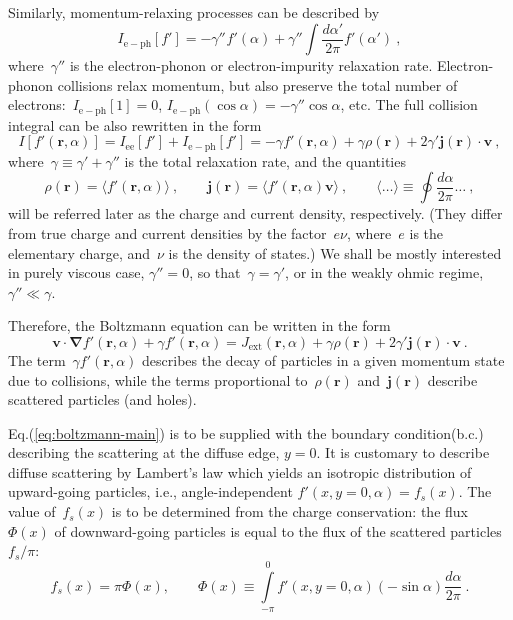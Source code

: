 \documentclass[preprint,aps,eqsecnum, prb]{revtex4-1}
\begin{document}
Similarly, momentum-relaxing processes can be described by
\begin{equation}
I_\mathrm{e-ph}[f'] = - \gamma'' _\mathrm{} f'(\alpha)
  + \gamma'' \int \frac{d\alpha'}{2\pi} f'(\alpha')
\ ,
\end{equation}
where~$\gamma''$ is the electron-phonon or electron-impurity relaxation rate.
Electron-phonon collisions relax momentum, but also preserve
the total number of electrons:~$I_\mathrm{e-ph}[1] = 0$,
$I_\mathrm{e-ph}(\cos\alpha) = - \gamma'' \cos\alpha$, etc.
The full collision integral can be also rewritten
in the form
\begin{equation}
  \label{eq:collision-integral}
  I[f'({\bm r}, \alpha)] = I_\mathrm{ee}[f'] + I_\mathrm{e-ph}[f'] =  -\gamma f'({\bm r}, \alpha)
  + \gamma \rho({\bm r}) + 2 \gamma' {\bm j}({\bm r}) \cdot {\bm v}
 \ ,
\end{equation}
where~$\gamma \equiv \gamma' + \gamma''$ is the total relaxation
rate, and the quantities
\begin{equation}
  \label{eq:rho-and-j}
  \rho({\bm r}) = \langle f'({\bm r}, \alpha) \rangle
  \ , \qquad
  {\bm j}({\bm r}) = \langle f'({\bm r}, \alpha) {\bm v} \rangle
  \ , \qquad
  \langle \dots \rangle \equiv \oint \frac{d\alpha}{2\pi} \dots
  \ ,
\end{equation}
will be referred later as the charge and current density, respectively.
(They differ from true charge and current densities by the factor~$e \nu$,
where~$e$ is the elementary charge, and~$\nu$ is the density of states.)
We shall be mostly interested in purely viscous case,
$\gamma'' = 0$, so that~$\gamma = \gamma'$, or in the weakly ohmic
regime, $\gamma'' \ll \gamma$.

Therefore, the Boltzmann equation can be written in the form
\begin{equation}
  \label{eq:boltzmann-main}
  {\bm v} \cdot{\bm \nabla }f'({\bm r}, \alpha) + \gamma f'({\bm r}, \alpha) =
  J_\mathrm{ext}({\bm r}, \alpha) + \gamma \rho({\bm r})
  + 2 \gamma' {\bm j}({\bm r}) \cdot {\bm v}
  \ .
\end{equation}
The term~$\gamma f'(\bm r, \alpha)$
describes the decay of particles in a given momentum state due to collisions,
while the terms proportional to~$\rho({\bm r})$ and~${\bm j}({\bm r})$
describe scattered particles (and holes).


Eq.(\ref{eq:boltzmann-main})
is to be supplied with the boundary condition(b.c.) describing
the scattering at the diffuse edge, $y = 0$.
It is customary to describe diffuse
scattering by Lambert's law which yields an isotropic
distribution of upward-going particles, i.e., angle-independent
\mbox{$f'(x, y=0, \alpha) = f_s(x)$}.
The value of~$f_s(x)$ is to be determined from the charge conservation:
the flux~$\Phi(x)$ of downward-going particles is equal
to the flux of the scattered particles $f_s / \pi$:
\begin{equation}
  \label{eq:lambert-bc}
  f_s(x) = \pi \Phi(x),  \qquad
  \Phi (x) \equiv \int\limits_{-\pi}^{0} f'(x, y = 0, \alpha)
  (-\sin \alpha) \frac{d\alpha}{2\pi} \ .
\end{equation}
\end{document}
